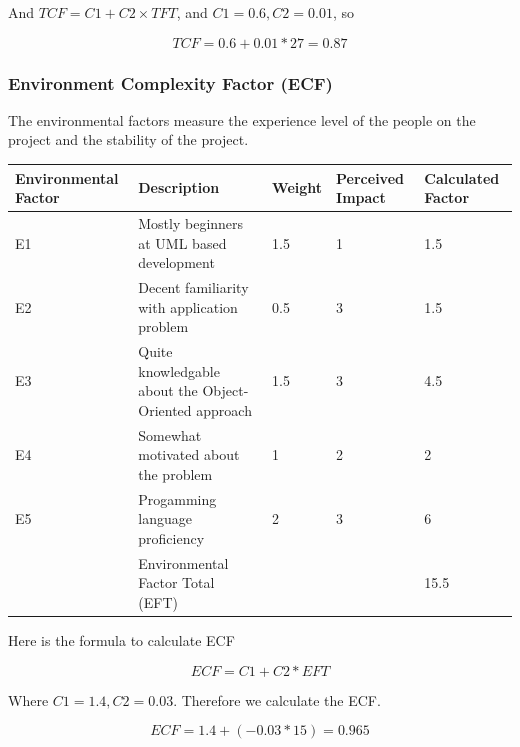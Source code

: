 \documentclass[letterpaper,english, 12pt]{scrreprt}
\begin{document}
And $TCF = C1 + C2 \times TFT$, and $C1 = 0.6, C2 = 0.01$, so

\begin{equation}
TCF = 0.6 + 0.01*27 = 0.87
\end{equation}

\subsubsection{Environment Complexity Factor (ECF)}

The environmental factors measure the experience level of the people on the project and the stability of the project. 

\begin{center}
        \begin{tabular}{|C{3cm}|C{5cm}|C{1.5cm}|C{2cm}|C{2cm}|}
                \hline
                        Environmental Factor & Description & Weight & Perceived Impact & Calculated Factor \\
                \hline
                        E1 & Mostly beginners at UML based development & 1.5 & 1 & 1.5 \\
                \hline
                        E2 & Decent familiarity with application problem& 0.5 & 3 & 1.5\\
                \hline
                        E3 & Quite knowledgable about the Object-Oriented approach & 1.5 & 3 & 4.5 \\
                \hline
                        E4 & Somewhat motivated about the problem & 1 & 2 & 2 \\
                \hline
                        E5 & Progamming language proficiency & 2 & 3 & 6 \\
                \hline
                           & Environmental Factor Total (EFT) & & & 15.5 \\
                \hline
        \end{tabular}
\end{center}

Here is the formula to calculate ECF

\begin{equation}
ECF = C1 + C2 * EFT
\end{equation}

Where $C1 = 1.4, C2 = 0.03$.  Therefore we calculate the ECF.

\begin{equation}
ECF = 1.4 + (-0.03*15)=0.965
\end{equation}
\end{document}
